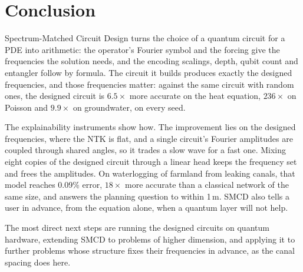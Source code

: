 \section{Conclusion}
\label{sec:conclusion}

Spectrum-Matched Circuit Design turns the choice of a quantum circuit for a PDE into
arithmetic: the operator's Fourier symbol and the forcing give the frequencies the
solution needs, and the encoding scalings, depth, qubit count and entangler follow by
formula. The circuit it builds produces exactly the designed frequencies, and those
frequencies matter: against the same circuit with random ones, the designed circuit is
$6.5\times$ more accurate on the heat equation, $236\times$ on Poisson and $9.9\times$ on
groundwater, on every seed.

The explainability instruments show how. The improvement lies on the designed
frequencies, where the NTK is flat, and a single circuit's Fourier amplitudes are coupled
through shared angles, so it trades a slow wave for a fast one. Mixing eight copies of the
designed circuit through a linear head keeps the frequency set and frees the amplitudes.
On waterlogging of farmland from leaking canals, that model reaches 0.09\% error,
$18\times$ more accurate than a classical network of the same size, and answers the
planning question to within 1\,m. SMCD also tells a user in advance, from the equation
alone, when a quantum layer will not help.

The most direct next steps are running the designed circuits on quantum hardware,
extending SMCD to problems of higher dimension, and applying it to further problems whose
structure fixes their frequencies in advance, as the canal spacing does here.
